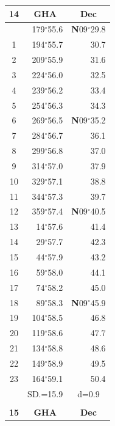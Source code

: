 \documentclass[10pt, a4paper]{report}
\begin{document}
\begin{scriptsize}
\begin{tabular*}{0.2\textwidth}[t]{@{\extracolsep{\fill}}|c|rr|}
\hline
\multicolumn{1}{|c|}{\rule{0pt}{2.6ex}\textbf{14}} & \multicolumn{1}{c}{\textbf{GHA}} & \multicolumn{1}{c|}{\textbf{Dec}}\\
\hline\rule{0pt}{2.6ex}\noindent
0 & 179$^\circ$55.6 & \textbf{N}09$^\circ$29.8\\
1 & 194$^\circ$55.7 & 30.7\\
2 & 209$^\circ$55.9 & 31.6\\
3 & 224$^\circ$56.0 & \raisebox{0.24ex}{\boldmath$\cdot$~\boldmath$\cdot$~~}32.5\\
4 & 239$^\circ$56.2 & 33.4\\
5 & 254$^\circ$56.3 & 34.3\\[2Pt]
6 & 269$^\circ$56.5 & \textbf{N}09$^\circ$35.2\\
7 & 284$^\circ$56.7 & 36.1\\
8 & 299$^\circ$56.8 & 37.0\\
9 & 314$^\circ$57.0 & \raisebox{0.24ex}{\boldmath$\cdot$~\boldmath$\cdot$~~}37.9\\
10 & 329$^\circ$57.1 & 38.8\\
11 & 344$^\circ$57.3 & 39.7\\[2Pt]
12 & 359$^\circ$57.4 & \textbf{N}09$^\circ$40.5\\
13 & 14$^\circ$57.6 & 41.4\\
14 & 29$^\circ$57.7 & 42.3\\
15 & 44$^\circ$57.9 & \raisebox{0.24ex}{\boldmath$\cdot$~\boldmath$\cdot$~~}43.2\\
16 & 59$^\circ$58.0 & 44.1\\
17 & 74$^\circ$58.2 & 45.0\\[2Pt]
18 & 89$^\circ$58.3 & \textbf{N}09$^\circ$45.9\\
19 & 104$^\circ$58.5 & 46.8\\
20 & 119$^\circ$58.6 & 47.7\\
21 & 134$^\circ$58.8 & \raisebox{0.24ex}{\boldmath$\cdot$~\boldmath$\cdot$~~}48.6\\
22 & 149$^\circ$58.9 & 49.5\\
23 & 164$^\circ$59.1 & 50.4\\
\hline
\rule{0pt}{2.4ex} & \multicolumn{1}{c}{SD.=15.9} & \multicolumn{1}{c|}{d=0.9}\\
\hline
\multicolumn{1}{c}{}\\[-0.5ex]\hline
\multicolumn{1}{|c|}{\rule{0pt}{2.6ex}\textbf{15}} & \multicolumn{1}{c}{\textbf{GHA}} & \multicolumn{1}{c|}{\textbf{Dec}}\\

\end{tabular*}
\end{scriptsize}
\end{document}
